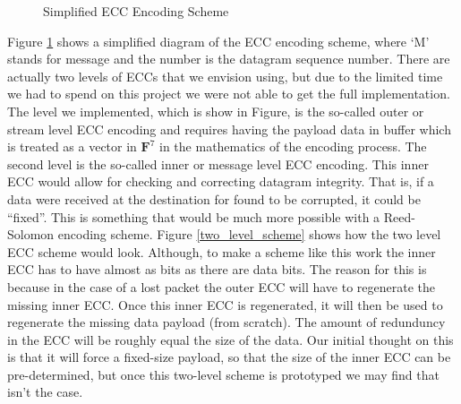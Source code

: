 \documentclass[conference]{IEEEtran}
\theoremstyle{definition}
\begin{document}
\begin{figure}[h!]
\caption{Simplified ECC Encoding Scheme}                                    %
\label{simplified_ecc_scheme}                                               %
\end{figure}                                                                %


Figure \ref{simplified_ecc_scheme}
shows a simplified diagram of the ECC encoding scheme,
where `M' stands for message and the number is the datagram
sequence number.  There are actually two levels of ECCs
that we envision using, but due to the limited time we
had to spend on this project we were not able to get the
full implementation.  The level we implemented,
which is show in Figure, is the so-called outer or
stream level ECC encoding and requires having the payload
data in buffer which is treated as a vector in $\mathbf{F}^7$
in the mathematics of the encoding process.  The second level
is the so-called inner or message level ECC encoding.  This
inner ECC would allow for checking and correcting datagram
integrity.  That is, if a data were received at the destination
for found to be corrupted, it could be ``fixed''.  This
is something that would be much more possible with a 
Reed-Solomon encoding scheme.  Figure \ref{two_level_scheme}
shows how the two level ECC scheme would look.  Although,
to make a scheme like this work the inner ECC has to have
almost as bits as there are data bits.  The reason for this
is because in the case of a lost packet the outer ECC will
have to regenerate the missing inner ECC.  Once this inner
ECC is regenerated, it will then be used to regenerate
the missing data payload (from scratch).  The amount
of redunduncy in the ECC will be roughly equal the size of
the data.  Our initial thought on this is that it will
force a fixed-size payload, so that the size of the inner
ECC can be pre-determined, but once this two-level scheme
is prototyped we may find that isn't the case.
\end{document}
